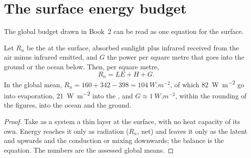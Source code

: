 \section{The surface energy budget}\label{sec:b1:radiation-heat-transport:surface}

The global budget drawn in Book~2 can be read as one equation for the surface.

\begin{proposition}\label{prop:b1:radiation-heat-transport:surface}
Let $R_n$ be the  at the surface, absorbed sunlight plus infrared
received from the air minus infrared emitted, and $G$ the power per square metre
that goes into the ground or the ocean below. Then, per square metre,
\[
  R_n = LE + H + G .
\]
In the global mean, $R_n = 160 + 342 - 398 = \qty{104}{W.m^{-2}}$, of which
\qty{82}{W.m^{-2}} go into evaporation, \qty{21}{W.m^{-2}} into the , and $G \approx \qty{1}{W.m^{-2}}$, within the rounding of the figures, into
the ocean and the ground.
\end{proposition}

\begin{proof}
Take as a system a thin layer at the surface, with no heat capacity of its own.
Energy reaches it only as radiation ($R_n$, net) and leaves it only as the latent
and  upwards and the conduction or mixing downwards; the
balance is the equation. The numbers are the assessed global means.
\end{proof}

